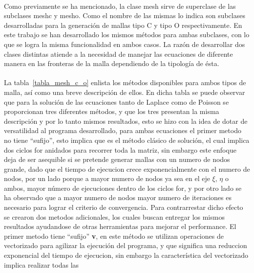 \documentclass[letterpaper, openright, 12pt]{book}
\begin{document}
    \paragraph*{}
    Como previamente se ha mencionado, la clase mesh sirve de superclase de
    las subclases mesh\textunderscore c y mesh\textunderscore o. Como el
    nombre de las mismas lo indica son subclases desarrolladas para la
    generación de mallas tipo C y tipo O respectivamente. En este trabajo se
    han desarrollado los mismos métodos para ambas subclases, con lo que se
    logra la misma funcionalidad en ambos casos. La razón de desarrollar dos
    clases distintas atiende a la necesidad de manejar las ecuaciones de
    diferente manera en las fronteras de la malla dependiendo de la
    tipología de ésta.

    \paragraph*{}
    La tabla~\ref{tabla_mesh_c_o} enlista los métodos
    disponibles para ambos tipos de malla, así como una breve descripción de
    ellos. En dicha tabla se puede observar que para la solución de las
    ecuaciones tanto de Laplace como de Poisson se proporcionan tres
    diferentes métodos, y que los tres presentan la misma descripción y por
    lo tanto mismos resultados, esto se hizo con la idea de dotar de
    versatilidad al programa desarrollado, para ambas ecuaciones el primer
    metodo no tiene ``sufijo'', esto implica que es el método clásico de
    solución, el cual implica dos ciclos for anidados para recorrer toda la
    matriz, sin embargo este enfoque deja de ser asequible si se pretende
    generar mallas con un numero de nodos grande, dado que el tiempo de
    ejecucion crece exponencialmente con el numero de nodos, por un lado
    porque a mayor numero de nodos ya sea en el eje $\xi$, $\eta$ o ambos,
    mayor número de ejecuciones dentro de los ciclos for, y por otro lado se
    ha observado que a mayor numero de nodos mayor numero de iteraciones
    es necesario para lograr el criterio de convergencia. Para
    contrarrestar dicho efecto se crearon dos metodos adicionales, los
    cuales buscan entregar los mismos resultados ayudandose de otras
    herramientas para mejorar el performance. El primer metodo tiene
    ``sufijo'' \textbf{\textunderscore v}, en este método se utilizan
    operaciones de vectorizado para agilizar la ejecución del programa, y
    que significa una reduccion exponencial del tiempo de ejecucion, sin
    embargo la característica del vectorizado implica realizar todas las
\end{document}
